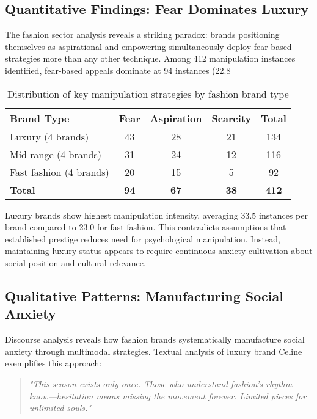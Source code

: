 \subsection{Quantitative Findings: Fear Dominates Luxury}

The fashion sector analysis reveals a striking paradox: brands positioning themselves as aspirational and empowering simultaneously deploy fear-based strategies more than any other technique. Among 412 manipulation instances identified, fear-based appeals dominate at 94 instances (22.8%

\begin{table}[h]
\centering
\begin{tabular}{|l|c|c|c|c|}
\hline
\textbf{Brand Type} & \textbf{Fear} & \textbf{Aspiration} & \textbf{Scarcity} & \textbf{Total} \\
\hline
Luxury (4 brands) & 43 & 28 & 21 & 134 \\
Mid-range (4 brands) & 31 & 24 & 12 & 116 \\
Fast fashion (4 brands) & 20 & 15 & 5 & 92 \\
\hline
\textbf{Total} & \textbf{94} & \textbf{67} & \textbf{38} & \textbf{412} \\
\hline
\end{tabular}
\caption{Distribution of key manipulation strategies by fashion brand type}
\end{table}

Luxury brands show highest manipulation intensity, averaging 33.5 instances per brand compared to 23.0 for fast fashion. This contradicts assumptions that established prestige reduces need for psychological manipulation. Instead, maintaining luxury status appears to require continuous anxiety cultivation about social position and cultural relevance.

\subsection{Qualitative Patterns: Manufacturing Social Anxiety}

Discourse analysis reveals how fashion brands systematically manufacture social anxiety through multimodal strategies. Textual analysis of luxury brand Celine exemplifies this approach:

\begin{quote}
\textit{"This season exists only once. Those who understand fashion's rhythm know—hesitation means missing the movement forever. Limited pieces for unlimited souls."}
\end{quote}

